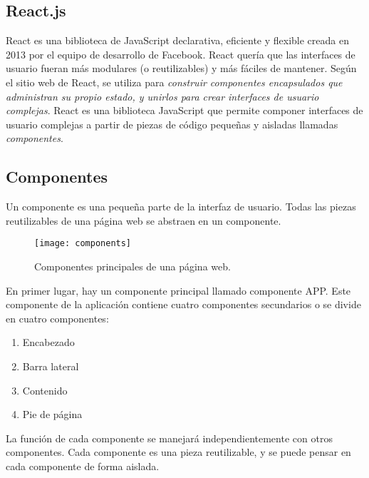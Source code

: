 \subsection{React.js}
React es una biblioteca de JavaScript declarativa, eficiente y flexible creada en 2013 por el equipo de desarrollo de Facebook. React quería que las interfaces de usuario fueran más modulares (o reutilizables) y más fáciles de mantener. Según el sitio web de React, se utiliza para \textit{construir componentes encapsulados que administran su propio estado, y unirlos para crear interfaces de usuario complejas}. React es una biblioteca JavaScript que permite componer interfaces de usuario complejas a partir de piezas de código pequeñas y aisladas llamadas \textit{componentes}.
\subsection{Componentes}
Un componente es una pequeña parte de la interfaz de usuario. Todas las piezas reutilizables de una página web se abstraen en un componente.
\begin{figure}[H]
  \centering
  \texttt{[image: components]}
  \caption{Componentes principales de una página web.}
\end{figure}
En primer lugar, hay un componente principal llamado componente APP. Este componente de la aplicación contiene cuatro componentes secundarios o se divide en cuatro componentes:
\begin{enumerate}
  \item Encabezado
  \item Barra lateral
  \item Contenido
  \item Pie de página
\end{enumerate}
La función de cada componente se manejará independientemente con otros componentes. Cada componente es una pieza reutilizable, y se puede pensar en cada componente de forma aislada.
